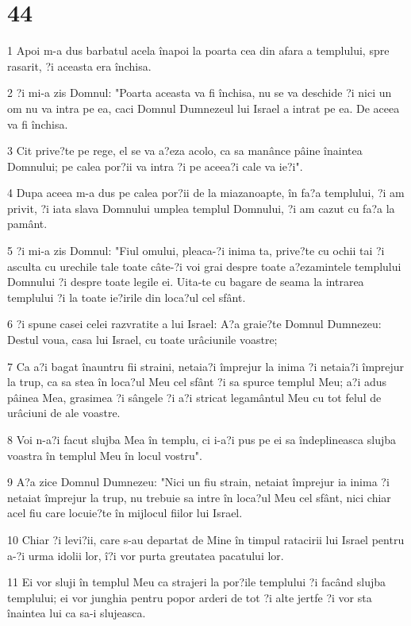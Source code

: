 \chapter{44}

\par 1 Apoi m-a dus barbatul acela înapoi la poarta cea din afara a templului, spre rasarit, ?i aceasta era închisa.
\par 2 ?i mi-a zis Domnul: "Poarta aceasta va fi închisa, nu se va deschide ?i nici un om nu va intra pe ea, caci Domnul Dumnezeul lui Israel a intrat pe ea. De aceea va fi închisa.
\par 3 Cit prive?te pe rege, el se va a?eza acolo, ca sa manânce pâine înaintea Domnului; pe calea por?ii va intra ?i pe aceea?i cale va ie?i".
\par 4 Dupa aceea m-a dus pe calea por?ii de la miazanoapte, în fa?a templului, ?i am privit, ?i iata slava Domnului umplea templul Domnului, ?i am cazut cu fa?a la pamânt.
\par 5 ?i mi-a zis Domnul: "Fiul omului, pleaca-?i inima ta, prive?te cu ochii tai ?i asculta cu urechile tale toate câte-?i voi grai despre toate a?ezamintele templului Domnului ?i despre toate legile ei. Uita-te cu bagare de seama la intrarea templului ?i la toate ie?irile din loca?ul cel sfânt.
\par 6 ?i spune casei celei razvratite a lui Israel: A?a graie?te Domnul Dumnezeu: Destul voua, casa lui Israel, cu toate urâciunile voastre;
\par 7 Ca a?i bagat înauntru fii straini, netaia?i împrejur la inima ?i netaia?i împrejur la trup, ca sa stea în loca?ul Meu cel sfânt ?i sa spurce templul Meu; a?i adus pâinea Mea, grasimea ?i sângele ?i a?i stricat legamântul Meu cu tot felul de urâciuni de ale voastre.
\par 8 Voi n-a?i facut slujba Mea în templu, ci i-a?i pus pe ei sa îndeplineasca slujba voastra în templul Meu în locul vostru".
\par 9 A?a zice Domnul Dumnezeu: "Nici un fiu strain, netaiat împrejur ia inima ?i netaiat împrejur la trup, nu trebuie sa intre în loca?ul Meu cel sfânt, nici chiar acel fiu care locuie?te în mijlocul fiilor lui Israel.
\par 10 Chiar ?i levi?ii, care s-au departat de Mine în timpul ratacirii lui Israel pentru a-?i urma idolii lor, î?i vor purta greutatea pacatului lor.
\par 11 Ei vor sluji în templul Meu ca strajeri la por?ile templului ?i facând slujba templului; ei vor junghia pentru popor arderi de tot ?i alte jertfe ?i vor sta înaintea lui ca sa-i slujeasca.
